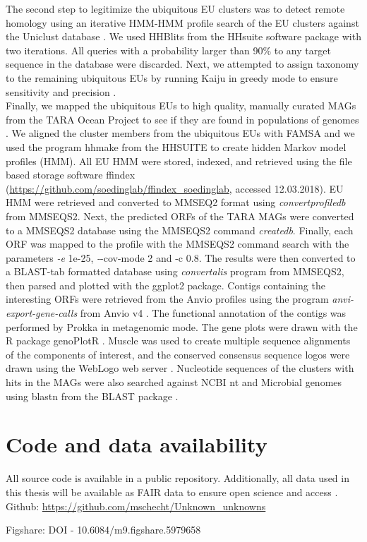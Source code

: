 The second step to legitimize the ubiquitous EU clusters was to detect remote homology using an iterative HMM-HMM profile search of the EU clusters against the Uniclust database \citep{Mirdita_2016}. We used HHBlits from the HHsuite software package \citep{Remmert_2011} with two iterations. All queries with a probability larger than 90\% to any target sequence in the database were discarded. Next, we attempted to assign taxonomy to the remaining ubiquitous EUs by running Kaiju in greedy mode to ensure sensitivity and precision \citep{Menzel_2016}.\\

Finally, we mapped the ubiquitous EUs to high quality, manually curated MAGs from the TARA Ocean Project to see if they are found in populations of genomes \citep{Delmont_2017}. We aligned the cluster members from the ubiquitous EUs with FAMSA \citep{Deorowicz_2016} and we used the program hhmake from the HHSUITE to create hidden Markov model profiles (HMM). All EU HMM were stored, indexed, and retrieved using the file based storage software ffindex (\url{https://github.com/soedinglab/ffindex_soedinglab}, accessed 12.03.2018). EU HMM were retrieved and converted to MMSEQ2 format using \textit{convertprofiledb} from MMSEQS2. Next, the predicted ORFs of the TARA MAGs were converted to a MMSEQS2 database using the MMSEQS2 command \textit{createdb}. Finally, each ORF was mapped to the profile with the MMSEQS2 command search with the parameters \textit{-e} 1e-25, \textit--cov-mode 2 and -c 0.8. The results were then converted to a BLAST-tab formatted database using \textit{convertalis} program from MMSEQS2, then parsed and plotted with the ggplot2 package. Contigs containing the interesting ORFs were retrieved from the Anvi\textquotesingle o profiles using the program \textit{anvi-export-gene-calls} from Anvi\textquotesingle o v4 \citep{Eren_2015}. The functional annotation of the contigs was performed by Prokka \cite{Seemann_2014}  in metagenomic mode. The gene plots were drawn with the R package genoPlotR \citep{Guy_2010}. Muscle \citep{Edgar_2004} was used to create multiple sequence alignments of the components of interest, and the conserved consensus sequence logos were drawn using the WebLogo web server \citep{Crooks_2004}. Nucleotide sequences of the clusters with hits in the MAGs were also searched against NCBI nt and Microbial genomes using blastn from the BLAST package \cite{Camacho_2009}.\\

\section{Code and data availability}

All source code is available in a public repository. Additionally, all data used in this thesis will be available as FAIR data to ensure open science and access \citep{Wilkinson_2016}.\\

Github: \url{https://github.com/mschecht/Unknown_unknowns}

Figshare: DOI - 10.6084/m9.figshare.5979658
